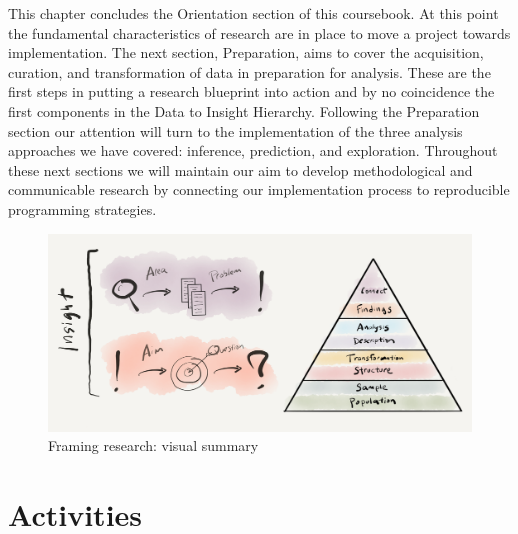 \documentclass[
  letterpaper,
]{scrbook}
\begin{document}
This chapter concludes the Orientation section of this coursebook. At
this point the fundamental characteristics of research are in place to
move a project towards implementation. The next section, Preparation,
aims to cover the acquisition, curation, and transformation of data in
preparation for analysis. These are the first steps in putting a
research blueprint into action and by no coincidence the first
components in the Data to Insight Hierarchy. Following the Preparation
section our attention will turn to the implementation of the three
analysis approaches we have covered: inference, prediction, and
exploration. Throughout these next sections we will maintain our aim to
develop methodological and communicable research by connecting our
implementation process to reproducible programming strategies.

\begin{figure}[h]

{\centering \includegraphics[width=6.98in,height=\textheight]{./figures/framing-research/framing-research-visual-summary.png}

}

\caption{\label{fig-framing-research-visual-summary-graphic}Framing
research: visual summary}

\end{figure}

\hypertarget{activities-3}{%
\section*{Activities}\label{activities-3}}

\end{document}
